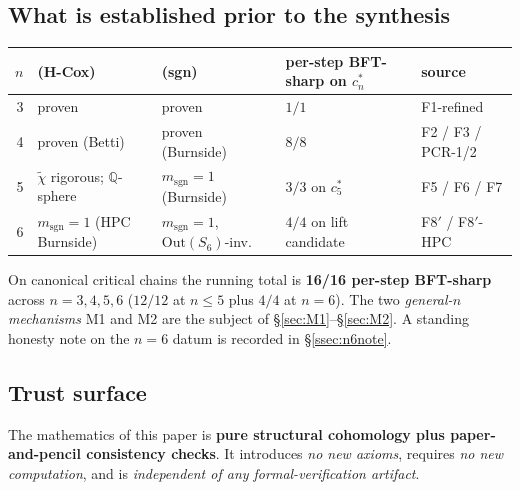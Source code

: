 \documentclass[11pt,reqno]{amsart}
\theoremstyle{plain}
\theoremstyle{definition}
\newcommand{\chired}{\widetilde\chi}
\newcommand{\sgn}{\mathrm{sgn}}
\newcommand{\Q}{\mathbb{Q}}
\newcommand{\cstar}[1]{c^{*}_{#1}}
\begin{document}
\subsection{What is established prior to the synthesis}\label{ssec:established}
\begin{center}
\begin{tabular}{r l l l l}
\toprule
$n$ & (H-Cox) & (sgn) & per-step BFT-sharp on $\cstar n$ & source \\
\midrule
3 & proven & proven & $1/1$ & F1-refined \\
4 & proven (Betti) & proven (Burnside) & $8/8$ & F2 / F3 / PCR-1/2 \\
5 & $\chired$ rigorous; $\Q$-sphere & $m_{\sgn}=1$ (Burnside) & $3/3$ on $\cstar5$ & F5 / F6 / F7 \\
6 & $m_{\sgn}=1$ (HPC Burnside) & $m_{\sgn}=1$, $\mathrm{Out}(S_6)$-inv. & $4/4$ on lift candidate & F8$'$ / F8$'$-HPC \\
\bottomrule
\end{tabular}
\end{center}
On canonical critical chains the running total is \textbf{16/16 per-step
BFT-sharp} across $n=3,4,5,6$ ($12/12$ at $n\le5$ plus $4/4$ at $n=6$).
The two \emph{general-$n$ mechanisms} M1 and M2 are the subject of
\S\ref{sec:M1}--\S\ref{sec:M2}. A standing honesty note on the $n=6$
datum is recorded in \S\ref{ssec:n6note}.

\subsection{Trust surface}\label{ssec:trust}
The mathematics of this paper is \textbf{pure structural cohomology
plus paper-and-pencil consistency checks}. It introduces \emph{no new
axioms}, requires \emph{no new computation}, and is \emph{independent of
any formal-verification artifact}.
\end{document}
